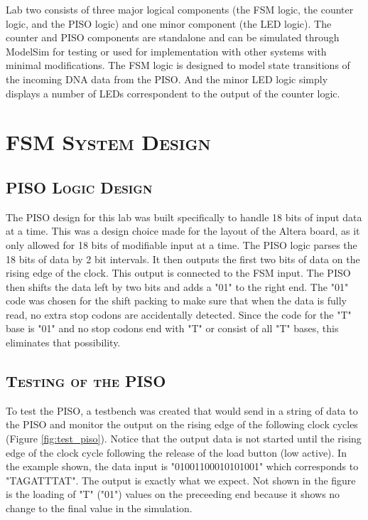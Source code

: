 \documentclass[11pt]{report}
\begin{document}
\begin{spacing}{1.5}
Lab two consists of three major logical components (the FSM logic, the counter logic, and the PISO logic) and one minor component (the LED logic).  The counter and PISO components are standalone and can be simulated through ModelSim for testing or used for implementation with other systems with minimal modifications.  The FSM logic is designed to model state transitions of the incoming DNA data from the PISO.  And the minor LED logic simply displays a number of LEDs correspondent to the output of the counter logic.

\section{\scshape FSM System Design} %
\label{sec:fsm_design}

\subsection{\scshape PISO Logic Design}
\label{sub:design_piso}

The PISO design for this lab was built specifically to handle 18 bits of input data at a time.  This was a design choice made for the layout of the Altera board, as it only allowed for 18 bits of modifiable input at a time. The PISO logic parses the 18 bits of data by 2 bit intervals.  It then outputs the first two bits of data on the rising edge of the clock.  This output is connected to the FSM input.  The PISO then shifts the data left by two bits and adds a "01" to the right end.  The "01" code was chosen for the shift packing to make sure that when the data is fully read, no extra stop codons are accidentally detected.  Since the code for the "T" base is "01" and no stop codons end with "T" or consist of all "T" bases, this eliminates that possibility.

\subsection{\scshape Testing of the PISO}
\label{sub:test_piso}

To test the PISO, a testbench was created that would send in a string of data to the PISO and monitor the output on the rising edge of the following clock cycles (Figure \ref{fig:test_piso}). Notice that the output data is not started until the rising edge of the clock cycle following the release of the load button (low active).  In the example shown, the data input is "01001100010101001" which corresponds to "TAGATTTAT".  The output is exactly what we expect. Not shown in the figure is the loading of "T" ("01") values on the preceeding end because it shows no change to the final value in the simulation.


\end{spacing}
\end{document}

